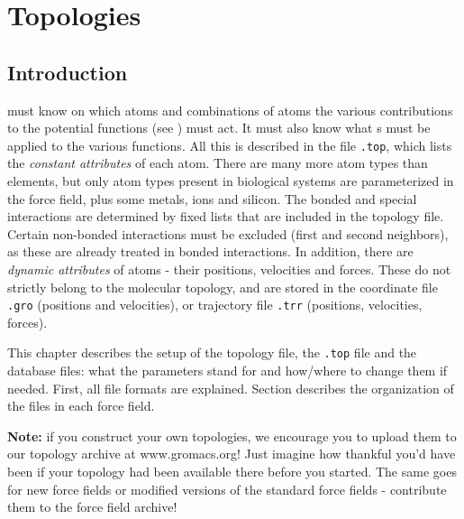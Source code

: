 %
% 
% 
% 
% 
% 
% 
% 
% 
%

\chapter{Topologies}
\label{ch:top}
\section{Introduction}
{\gromacs} must know on which atoms and combinations of atoms the
various contributions to the potential functions (see
) must act. It must
also know what s must be applied to the various
functions. All this is described in the {\em {}} file
{\tt *.top}, which lists the {\em constant attributes} of each atom.
There are many more atom types than elements, but only atom types
present in biological systems are parameterized in the force field,
plus some metals, ions and silicon. The bonded and special
interactions are determined by fixed lists that are included in the
topology file. Certain non-bonded interactions must be excluded (first
and second neighbors), as these are already treated in bonded
interactions.  In addition, there are {\em dynamic attributes} of
atoms - their positions, velocities and forces. These do not
strictly belong to the molecular topology, and are stored in the
coordinate file {\tt *.gro} (positions and velocities), or trajectory
file {\tt *.trr} (positions, velocities, forces).

This chapter describes the setup of the topology file, the
{\tt *.top} file and the database files: what the parameters
stand for and how/where to change them if needed.
First, all file formats are explained.
Section  describes the organization of
the files in each force field.

{\bf Note:} if you construct your own topologies, we encourage you
to upload them to our topology archive at www.gromacs.org! Just imagine
how thankful you'd have been if your topology had been available
there before you started. The same goes for new force fields or
modified versions of the standard force fields - contribute them
to the force field archive!

